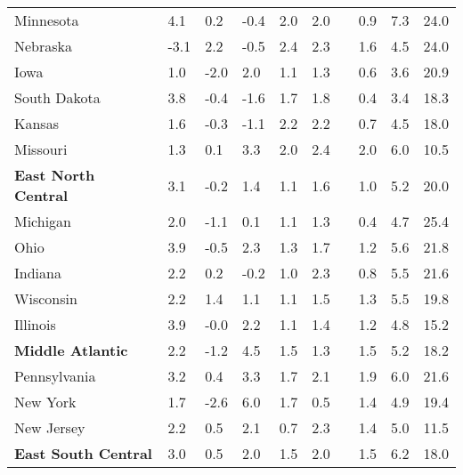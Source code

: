 {\begin{tabular}{p{30mm} R{7mm} R{7mm} R{7mm} R{7mm} 
             R{7mm} p{0mm} R{9mm} R{9mm} R{10mm} }
\hspace{3mm}  Minnesota  & 4.1 & 0.2 & -0.4 & 2.0 & 2.0 &  & 0.9 & 7.3 & 24.0 \\
\hspace{3mm}  Nebraska  & -3.1 & 2.2 & -0.5 & 2.4 & 2.3 &  & 1.6 & 4.5 & 24.0 \\
\hspace{3mm}  Iowa  & 1.0 & -2.0 & 2.0 & 1.1 & 1.3 &  & 0.6 & 3.6 & 20.9 \\
\hspace{3mm}  South Dakota  & 3.8 & -0.4 & -1.6 & 1.7 & 1.8 &  & 0.4 & 3.4 & 18.3 \\
\hspace{3mm}  Kansas  & 1.6 & -0.3 & -1.1 & 2.2 & 2.2 &  & 0.7 & 4.5 & 18.0 \\
\hspace{3mm}  Missouri  & 1.3 & 0.1 & 3.3 & 2.0 & 2.4 &  & 2.0 & 6.0 & 10.5 \\
\hspace{1mm} \textbf{East North Central}  & 3.1 & -0.2 & 1.4 & 1.1 & 1.6 &  & 1.0 & 5.2 & 20.0 \\
\hspace{3mm}  Michigan  & 2.0 & -1.1 & 0.1 & 1.1 & 1.3 &  & 0.4 & 4.7 & 25.4 \\
\hspace{3mm}  Ohio  & 3.9 & -0.5 & 2.3 & 1.3 & 1.7 &  & 1.2 & 5.6 & 21.8 \\
\hspace{3mm}  Indiana  & 2.2 & 0.2 & -0.2 & 1.0 & 2.3 &  & 0.8 & 5.5 & 21.6 \\
\hspace{3mm}  Wisconsin  & 2.2 & 1.4 & 1.1 & 1.1 & 1.5 &  & 1.3 & 5.5 & 19.8 \\
\hspace{3mm}  Illinois  & 3.9 & -0.0 & 2.2 & 1.1 & 1.4 &  & 1.2 & 4.8 & 15.2 \\
\hspace{1mm} \textbf{Middle Atlantic}  & 2.2 & -1.2 & 4.5 & 1.5 & 1.3 &  & 1.5 & 5.2 & 18.2 \\
\hspace{3mm}  Pennsylvania  & 3.2 & 0.4 & 3.3 & 1.7 & 2.1 &  & 1.9 & 6.0 & 21.6 \\
\hspace{3mm}  New York  & 1.7 & -2.6 & 6.0 & 1.7 & 0.5 &  & 1.4 & 4.9 & 19.4 \\
\hspace{3mm}  New Jersey  & 2.2 & 0.5 & 2.1 & 0.7 & 2.3 &  & 1.4 & 5.0 & 11.5 \\
\hspace{1mm} \textbf{East South Central}  & 3.0 & 0.5 & 2.0 & 1.5 & 2.0 &  & 1.5 & 6.2 & 18.0 \\

\end{tabular}}
